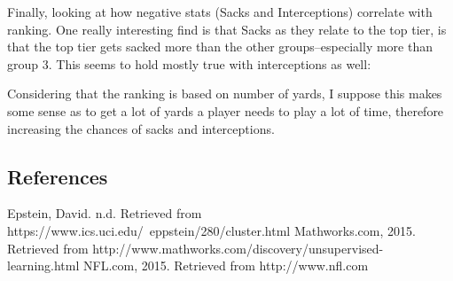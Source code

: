 \documentclass[10pt]{article}
\begin{document}
\par
Finally, looking at how negative stats (Sacks and Interceptions) correlate with ranking. One really interesting find is that Sacks as they relate to the top tier, is that the top tier gets sacked more than the other groups--especially more than group 3. This seems to hold mostly true with interceptions as well:
\par
{}%
\hfill
{}%
\par
Considering that the ranking is based on number of yards, I suppose this makes some sense as to get a lot of yards a player needs to play a lot of time, therefore increasing the chances of sacks and interceptions. 

\subsection*{References}
Epstein, David. n.d. Retrieved from https://www.ics.uci.edu/~eppstein/280/cluster.html
Mathworks.com, 2015. Retrieved from http://www.mathworks.com/discovery/unsupervised-learning.html
NFL.com, 2015. Retrieved from http://www.nfl.com
\end{document}
